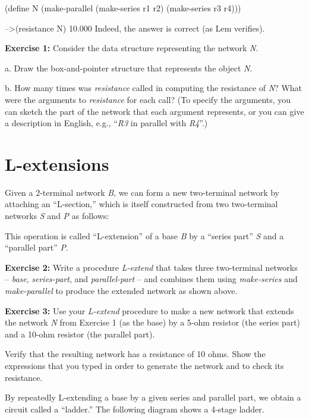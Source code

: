 (define N
  (make-parallel (make-series r1 r2)
                 (make-series r3 r4)))

-->(resistance N)
10.000
\endlisp
Indeed, the answer is correct (as Lem verifies).

{\bf Exercise 1:}
Consider the data structure representing the network {\it N}.

{a.}
Draw the box-and-pointer structure that represents the object {\it N}.

{b.}
How many times was {\it resistance} called in computing the resistance of
{\it N}?  What were the arguments to {\it resistance} for each call?  (To
specify the arguments, you can sketch the part of the network that
each argument represents, or you can give a description in English,
e.g., ``{\it R3} in parallel with {\it R4}''.)

\begin{minipage}[t]{\linewidth}
\section{L-extensions}

Given a 2-terminal network {\it B}, we can form a new two-terminal
network by attaching an ``L-section,'' which is itself constructed
from two two-terminal networks {\it S} and {\it P} as follows:

\vspace{3.5in}
\end{minipage}

This operation is called ``L-extension'' of a base {\it B} by a ``series
part'' {\it S} and a ``parallel part'' {\it P}.

{\bf Exercise 2:}
Write a procedure {\it L-extend} that takes three two-terminal networks --
{\it base}, {\it series-part}, and {\it parallel-part} -- and combines them
using {\it make-series} and {\it make-parallel} to produce the extended
network as shown above.


{\bf Exercise 3:}
Use your {\it L-extend} procedure to make a new network that extends the
network {\it N} from Exercise 1 (as the base) by a 5-ohm resistor (the
series part) and a 10-ohm resistor (the parallel part).

Verify that the resulting network has a resistance of 10 ohms.  Show
the expressions that you typed in order to generate the network and to
check its resistance.



By repeatedly L-extending a base by a given series and parallel
part, we obtain a circuit called a ``ladder.''  The following diagram
shows a 4-stage ladder.

